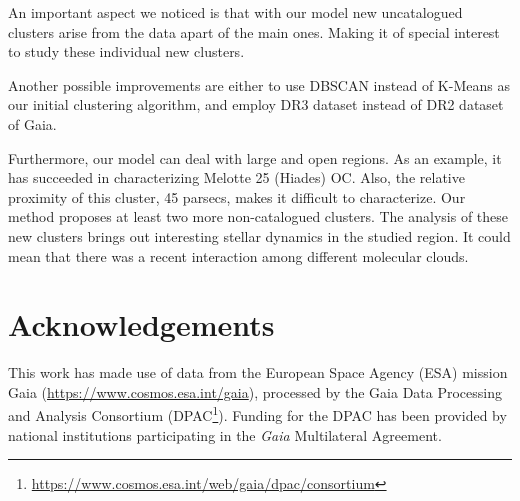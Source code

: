 \documentclass[preprint,12pt,authoryear]{elsarticle}
\begin{document}
An important aspect we noticed is that with our model new uncatalogued clusters arise from the data apart of the main ones. Making it of special interest to study these individual new clusters.

Another possible improvements are either to use DBSCAN instead of K-Means as our initial clustering algorithm, and employ DR3 dataset instead of DR2 dataset of Gaia.

Furthermore, our model can deal with large and open regions. As an example, it has succeeded in characterizing Melotte 25 (Hiades) OC. Also, the relative proximity of this cluster, 45 parsecs, makes it difficult to characterize. Our method proposes at least two more non-catalogued clusters. The analysis of these new clusters brings out interesting stellar dynamics in the studied region. It could mean that there was a recent interaction among different molecular clouds.

\section{Acknowledgements}

This work has made use of data from the European Space Agency (ESA) mission
 Gaia (\url{https://www.cosmos.esa.int/gaia}), processed by the Gaia
Data Processing and Analysis Consortium (DPAC\footnote{ \url{https://www.cosmos.esa.int/web/gaia/dpac/consortium}}). Funding for the DPAC
has been provided by national institutions participating in the {\it Gaia} Multilateral Agreement.



\end{document}
